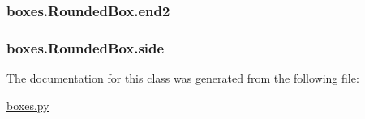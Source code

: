 \subsubsection[{end2}]{\setlength{\rightskip}{0pt plus 5cm}boxes.\+Rounded\+Box.\+end2}\label{classboxes_1_1_rounded_box_a0bfab353f08c5f127b2811db4a8eb8ac}
\hypertarget{classboxes_1_1_rounded_box_a1e345027fcdf3930a1e4c6f9c5bfaccf}{}
\subsubsection[{side}]{\setlength{\rightskip}{0pt plus 5cm}boxes.\+Rounded\+Box.\+side}\label{classboxes_1_1_rounded_box_a1e345027fcdf3930a1e4c6f9c5bfaccf}


The documentation for this class was generated from the following file\+:\begin{DoxyCompactItemize}
\item 
\hyperlink{boxes_8py}{boxes.\+py}\end{DoxyCompactItemize}
